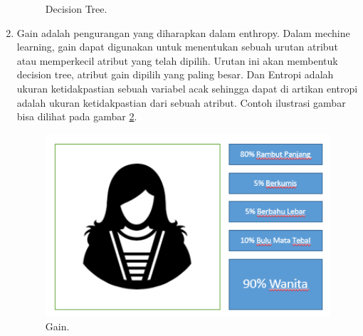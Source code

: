\begin{enumerate}
\begin{figure}[!htbp]
		\caption{Decision Tree.}
		\label{7}
\end{figure}
\item Gain adalah pengurangan yang diharapkan dalam enthropy. Dalam mechine learning, gain dapat digunakan untuk menentukan sebuah urutan atribut atau memperkecil atribut yang telah dipilih. Urutan ini akan membentuk decision tree, atribut gain dipilih yang paling besar. Dan Entropi adalah ukuran ketidakpastian sebuah variabel acak sehingga dapat di artikan entropi adalah ukuran ketidakpastian dari sebuah atribut.
\subitem Contoh ilustrasi gambar bisa dilihat pada gambar \ref{8}.
\begin{figure}[!htbp]
		\centerline{\includegraphics[width=1\textwidth]{figures/huda/Gain.PNG}}
		\caption{Gain.}
		\label{8}
\end{figure}
\end{enumerate}

